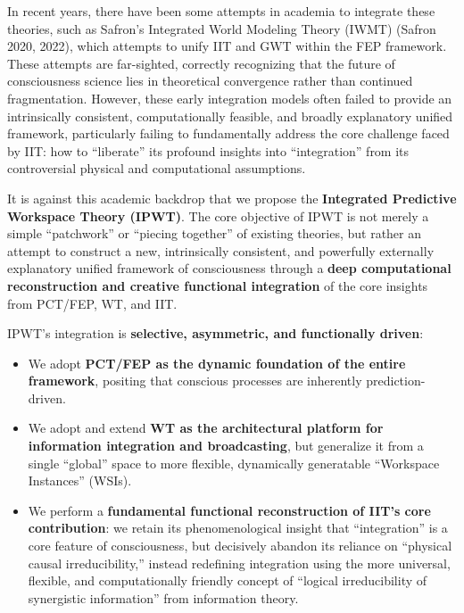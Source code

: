 \documentclass[
  a4paper]{article}
\providecommand{\tightlist}{%
  \setlength{\itemsep}{0pt}\setlength{\parskip}{0pt}}
\begin{document}
In recent years, there have been some attempts in academia to integrate
these theories, such as Safron's Integrated World Modeling Theory (IWMT)
(Safron 2020, 2022), which attempts to unify IIT and GWT within the FEP
framework. These attempts are far-sighted, correctly recognizing that
the future of consciousness science lies in theoretical convergence
rather than continued fragmentation. However, these early integration
models often failed to provide an intrinsically consistent,
computationally feasible, and broadly explanatory unified framework,
particularly failing to fundamentally address the core challenge faced
by IIT: how to ``liberate'' its profound insights into ``integration''
from its controversial physical and computational assumptions.

It is against this academic backdrop that we propose the
\textbf{Integrated Predictive Workspace Theory (IPWT)}. The core
objective of IPWT is not merely a simple ``patchwork'' or ``piecing
together'' of existing theories, but rather an attempt to construct a
new, intrinsically consistent, and powerfully externally explanatory
unified framework of consciousness through a \textbf{deep computational
reconstruction and creative functional integration} of the core insights
from PCT/FEP, WT, and IIT.

IPWT's integration is \textbf{selective, asymmetric, and functionally
driven}:

\begin{itemize}
\tightlist
\item
  We adopt \textbf{PCT/FEP as the dynamic foundation of the entire
  framework}, positing that conscious processes are inherently
  prediction-driven.
\item
  We adopt and extend \textbf{WT as the architectural platform for
  information integration and broadcasting}, but generalize it from a
  single ``global'' space to more flexible, dynamically generatable
  ``Workspace Instances'' (WSIs).
\item
  We perform a \textbf{fundamental functional reconstruction of IIT's
  core contribution}: we retain its phenomenological insight that
  ``integration'' is a core feature of consciousness, but decisively
  abandon its reliance on ``physical causal irreducibility,'' instead
  redefining integration using the more universal, flexible, and
  computationally friendly concept of ``logical irreducibility of
  synergistic information'' from information theory.
\end{itemize}
\end{document}
